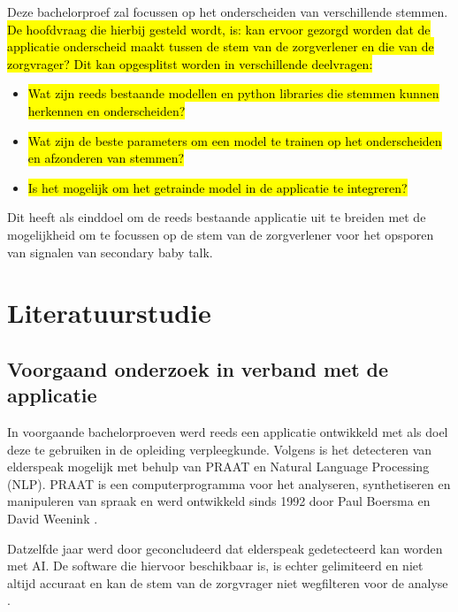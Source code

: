 Deze bachelorproef zal focussen op het onderscheiden van verschillende stemmen. \hl{De hoofdvraag die hierbij gesteld wordt, is: kan ervoor gezorgd worden dat de applicatie onderscheid maakt tussen de stem van de zorgverlener en die van de zorgvrager? Dit kan opgesplitst worden in verschillende deelvragen:}
\begin{itemize}
	\item \hl{Wat zijn reeds bestaande modellen en python libraries die stemmen kunnen herkennen en onderscheiden?}
	\item \hl{Wat zijn de beste parameters om een model te trainen op het onderscheiden en afzonderen van stemmen?}
	\item \hl{Is het mogelijk om het getrainde model in de applicatie te integreren?}
\end{itemize}
Dit heeft als einddoel om de reeds bestaande applicatie uit te breiden met de mogelijkheid om te focussen op de stem van de zorgverlener voor het opsporen van signalen van secondary baby talk.


\section{Literatuurstudie}%
\label{sec:literatuurstudie}

\subsection{Voorgaand onderzoek in verband met de applicatie}%

In voorgaande bachelorproeven werd reeds een applicatie ontwikkeld met als doel deze te gebruiken in de opleiding verpleegkunde. Volgens \textcite{Govaerts2022} is het detecteren van elderspeak mogelijk met behulp van PRAAT en Natural Language Processing (NLP). PRAAT is een computerprogramma voor het analyseren, synthetiseren en manipuleren van spraak en werd ontwikkeld sinds 1992 door Paul Boersma en David Weenink \autocite{Govaerts2022}.

Datzelfde jaar werd door \textcite{Gussem2022} geconcludeerd dat elderspeak gedetecteerd kan worden met AI. De software die hiervoor beschikbaar is, is echter gelimiteerd en niet altijd accuraat en kan de stem van de zorgvrager niet wegfilteren voor de analyse \autocite{Gussem2022}.

